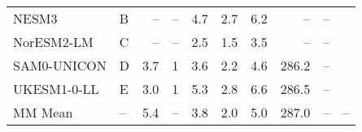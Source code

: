 \begin{table}
\begin{tabular}{llrrrrrrrl}
NESM3           &   B &    -- &                    -- &  4.7 &  2.7 &   6.2 &     -- &                   -- &  \citet{ringer20cmip} \\
NorESM2-LM      &   C &    -- &                    -- &  2.5 &  1.5 &   3.5 &     -- &                   -- &  \citet{ringer20cmip} \\
SAM0-UNICON     &   D &   3.7 &                       1 &  3.6 &  2.2 &   4.6 &  286.2 &                   -- &  \citet{ringer20cmip} \\
UKESM1-0-LL     &   E &   3.0 &                       1 &  5.3 &  2.8 &   6.6 &  286.5 &                   -- &  \citet{ringer20cmip} \\
MM Mean         &  -- &   5.4 &                    -- &  3.8 &  2.0 &   5.0 &  287.0 &                   -- &                    -- \\
\bottomrule
\end{tabular}
\end{table}
